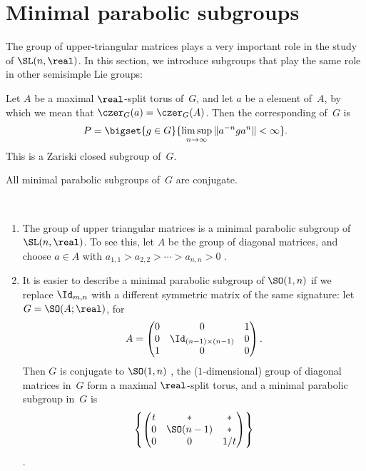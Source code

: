 \section{Minimal parabolic subgroups} \label{ParabSubgrpSect}

The group of upper-triangular matrices plays a very important role in the study of $\SL(n,\real)$. In this section, we introduce subgroups that play the same role in other semisimple Lie groups:

\begin{defn} \label{MinParabDefn}
Let $A$ be a maximal $\real$-split torus of~$G$, and let $a$ be a  element of~$A$, by which we mean that $\czer_G(a) = \czer_G(A)$. Then the corresponding  of~$G$ is
	\begin{align} \label{P=horo}
	P = \bigset{ g \in G }{ \limsup_{n \to \infty} \| a^{-n} g a^n \| < \infty } 
	. \end{align}
This is a Zariski closed subgroup of~$G$.
 \end{defn}

\begin{thm} \label{MinParabConj}
All minimal parabolic subgroups of~$G$ are conjugate.
\end{thm}

\begin{egs} \ \label{ParabEgs}
 \noprelistbreak
 \begin{enumerate}

\item \label{ParabEgs-SLn}
The group of upper triangular matrices is a minimal parabolic subgroup of $\SL(n,\real)$. To see this, let $A$ be the group of diagonal matrices, and choose $a \in A$ with $a_{1,1} > a_{2,2} > \cdots > a_{n,n} > 0$ . 

 \item \label{ParabEgs-SO1n}
 It is easier to describe a minimal parabolic subgroup of $\SO(1,n)$ if
we replace $\Id_{m,n}$ with a different symmetric matrix of
the same signature: let 
 $G = \SO(A;\real)$, for
 $$ A =
 \begin{pmatrix}
 0 & 0 & 1 \\
 0 & \Id_{(n-1) \times (n-1)} & 0 \\
 1 & 0 & 0
 \end{pmatrix}
 .$$
 Then $G$ is conjugate to $\SO(1,n)$ ,
 the ($1$-dimensional) group of diagonal matrices in~$G$ form a maximal $\real$-split torus, and a minimal parabolic subgroup in~$G$ is
 $$\left\{\begin{pmatrix}
 t&*&* \\
 0& \SO(n-1) & * \\
 0&0&1/t
 \end{pmatrix}
 \right\}
 $$
 .
 \end{enumerate}
 \end{egs}

